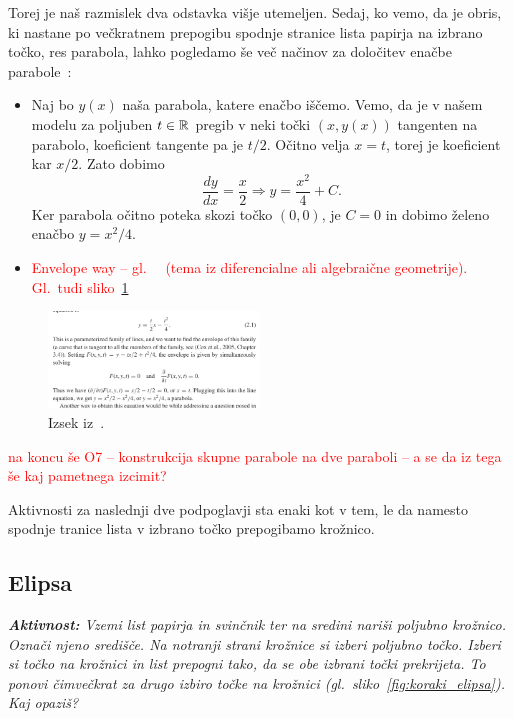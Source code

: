 Torej je naš razmislek dva odstavka višje utemeljen. Sedaj, ko vemo, da je obris, ki nastane po večkratnem prepogibu spodnje stranice lista papirja na izbrano točko, res parabola, lahko pogledamo še več načinov za določitev enačbe parabole~\cite[str.\ 55--56]{hull2013}:
\begin{itemize}
    \item Naj bo $y(x)$ naša parabola, katere enačbo iščemo. Vemo, da je v našem modelu za poljuben $t \in \mathbb R$ pregib v neki točki $(x, y(x))$ tangenten na parabolo, koeficient tangente pa je $t / 2$. Očitno velja $x = t$, torej je koeficient kar $x / 2$. Zato dobimo
    $$ \frac{dy}{dx} = \frac{x}{2} \Rightarrow y = \frac{x^2}{4} + C. $$
    Ker parabola očitno poteka skozi točko $(0, 0)$, je $C = 0$ in dobimo želeno enačbo $y = x^2 / 4$.
    \item \textcolor{red}{Envelope way -- gl.\ ~\cite[str.\ 56 spodaj]{hull2013} (tema iz diferencialne ali algebraične geometrije). Gl.\ tudi sliko~\ref{fig:envelope}}
\end{itemize}

\begin{figure}[h]
    \centering
    \includegraphics[width=0.5\textwidth]{images/hull2020_envelope_way.png}
    \caption[Envelope]{Izsek iz~\cite[str.\ 32]{hull2020}.}
    \label{fig:envelope}
\end{figure}

\textcolor{red}{na koncu še O7 -- konstrukcija skupne parabole na dve paraboli -- a se da iz tega še kaj pametnega izcimit?}

Aktivnosti za naslednji dve podpoglavji sta enaki kot v tem, le da namesto spodnje tranice lista v izbrano točko prepogibamo krožnico.

\subsection{Elipsa}

\textit{\textbf{Aktivnost:} Vzemi list papirja in svinčnik ter na sredini nariši poljubno krožnico. Označi njeno središče. Na notranji strani krožnice si izberi poljubno točko. Izberi si točko na krožnici in list prepogni tako, da se obe izbrani točki prekrijeta. To ponovi čimvečkrat za drugo izbiro točke na krožnici (gl.\ sliko~\ref{fig:koraki_elipsa}). Kaj opaziš?}


